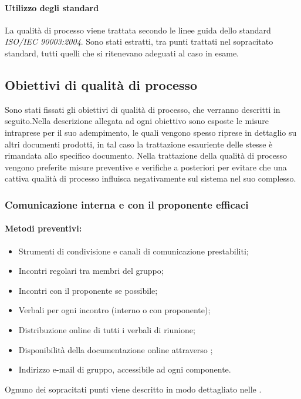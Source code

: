 \documentclass[12pt,a4paper]{article}
\begin{document}
\paragraph{Utilizzo degli standard}
La qualità di processo viene trattata secondo le linee guida dello standard \textit{ISO/IEC 90003:2004}. Sono stati estratti, tra punti trattati nel sopracitato standard, tutti quelli che si ritenevano adeguati al caso in esame.

\subsection{Obiettivi di qualità di processo}
Sono stati fissati gli obiettivi di qualità di processo, che verranno descritti in seguito.Nella descrizione allegata ad ogni obiettivo sono esposte le misure intraprese per il suo adempimento, le quali vengono spesso riprese in dettaglio su altri documenti prodotti, in tal caso la trattazione esauriente delle stesse è rimandata allo specifico documento. 
Nella trattazione della qualità di processo vengono preferite misure preventive e verifiche a posteriori per evitare che una cattiva qualità di processo influisca negativamente sul sistema nel suo complesso.

\subsubsection{Comunicazione interna e con il proponente efficaci}
\paragraph{Metodi preventivi:}
\begin{itemize}
	\item Strumenti di condivisione e canali di comunicazione prestabiliti;
	\item Incontri regolari tra membri del gruppo;
	\item Incontri con il proponente se possibile;
	\item Verbali per ogni incontro (interno o con proponente);
	\item Distribuzione online di tutti i verbali di riunione;
	\item Disponibilità della documentazione online attraverso ;
	\item Indirizzo e-mail di gruppo, accessibile ad ogni componente.
\end{itemize}
Ognuno dei sopracitati punti viene descritto in modo dettagliato nelle \NdP{}.
\end{document}

